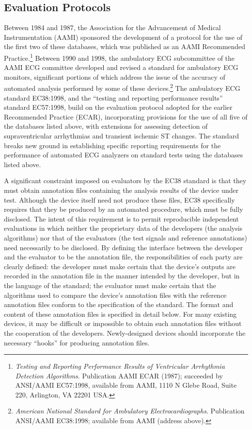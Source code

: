 \documentclass[twoside]{article}
\begin{document}
\subsection{Evaluation Protocols}
Between 1984 and 1987, the Association for the Advancement of Medical
Instrumentation (AAMI) sponsored the development of a protocol for the
use of the first two of these databases, which was published as an
AAMI Recommended Practice.\footnote{{\it Testing and Reporting
Performance Results of Ventricular Arrhythmia Detection
Algorithms}. Publication AAMI ECAR (1987); succeeded by ANSI/AAMI
EC57:1998, available from AAMI, 1110 N Glebe Road, Suite 220,
Arlington, VA 22201 USA.}  Between 1990 and 1998, the ambulatory ECG
subcommittee of the AAMI ECG committee developed and revised a
standard for ambulatory ECG monitors, significant portions of which
address the issue of the accuracy of automated analysis performed by
some of these devices.\footnote{{\it American National Standard for
Ambulatory Electrocardiographs}.  Publication ANSI/AAMI EC38:1998;
available from AAMI (address above).}  The ambulatory ECG standard
EC38:1998, and the ``testing and reporting performance results''
standard EC57:1998, build on the evaluation protocol adopted for the
earlier Recommended Practice (ECAR), incorporating provisions for the
use of all five of the databases listed above, with extensions for
assessing detection of supraventricular arrhythmias and transient
ischemic ST changes.  The standard breaks new ground in establishing
specific reporting requirements for the performance of automated ECG
analyzers on standard tests using the databases listed above.

A significant constraint imposed on evaluators by the EC38 standard
is that they must obtain annotation files containing the analysis
results of the device under test.  Although the device itself need not
produce these files, EC38 specifically requires that they be produced
by an automated procedure, which must be fully disclosed.  The intent
of this requirement is to permit reproducible independent evaluations
in which neither the proprietary data of the developers (the analysis
algorithms) nor that of the evaluators (the test signals and reference
annotations) need necessarily to be disclosed.  By defining the
interface between the developer and the evaluator to be the annotation
file, the responsibilities of each party are clearly defined: the
developer must make certain that the device's outputs are recorded in
the annotation file in the manner intended by the developer, but in
the language of the standard; the evaluator must make certain
that the algorithms used to compare the device's annotation files with
the reference annotation files conform to the specification of the
standard.  The format and content of these annotation files is
specified in detail below.  For many existing devices, it may be
difficult or impossible to obtain such annotation files without the
cooperation of the developers.  Newly-designed devices should
incorporate the necessary ``hooks'' for producing annotation files.
\end{document}
